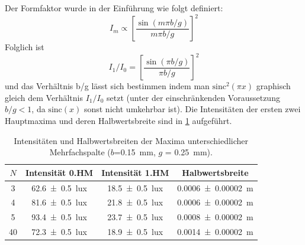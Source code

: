 \documentclass[
	a4paper,
	12pt,
	pagesize,
	ngerman
]{scrartcl}
\begin{document}
	Der Formfaktor wurde in der Einführung wie folgt definiert: 
	\begin{equation}
		I_m \propto \left[\frac{\sin(m\pi b/g)}{m\pi b/g}\right]^2
	\end{equation}
	Folglich ist
	\begin{equation}
		I_1/I_0 = \left[\frac{\sin(\pi b/g)}{\pi b/g}\right]^2
	\end{equation}
	und das Verhältnis b/g lässt sich bestimmen indem man $ \text{sinc}^2(\pi x)$ graphisch gleich dem Verhältnis $I_1/I_0$ setzt (unter der einschränkenden Voraussetzung $b/g<1$, da $\text{sinc}(x)$ sonst nicht umkehrbar ist).
	Die Intensitäten der ersten zwei Hauptmaxima und deren Halbwertsbreite sind in \cref{GitterTabelle} aufgeführt. 
	\begin{table}[H]
		\centering
		\begin{tabular}{ c | c | c | c }
			$N$ &  Intensität 0.HM & Intensität 1.HM & Halbwertsbreite\\ \hline
			3 & \SI{62,6 +- 0,5}{lux} & \SI{18,5 +- 0,5}{lux} & \SI{0,0006+- 0,00002}{m} \\
			4 & \SI{81,6 +- 0,5}{lux} & \SI{21,8 +- 0,5}{lux} & \SI{0,0006+- 0,00002}{m} \\
			5 & \SI{93,4 +- 0,5}{lux} & \SI{23,7 +- 0,5}{lux} & \SI{0,0008+- 0,00002}{m} \\
			40& \SI{72,3 +- 0,5}{lux} & \SI{18,9 +- 0,5}{lux} & \SI{0,0014+- 0,00002}{m} \\
		\end{tabular}
		\caption{Intensitäten und Halbwertsbreiten der Maxima unterschiedlicher Mehrfachspalte ($b$=\SI{0,15}{mm}, $g$ = \SI{0,25}{mm}).}
		\label{GitterTabelle} 
	\end{table}
	
\end{document}
